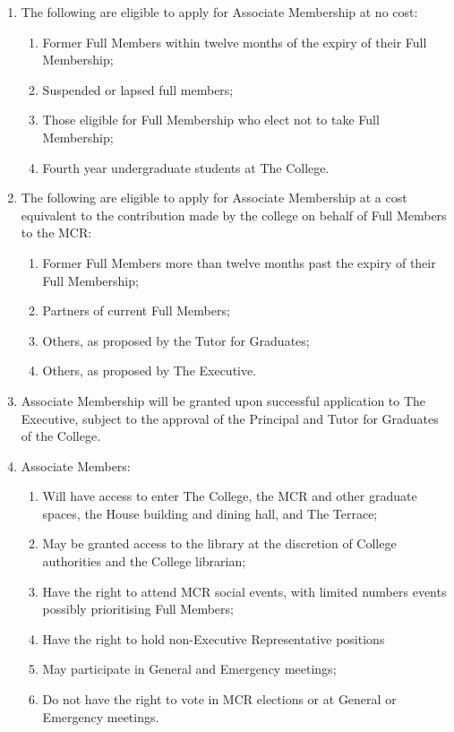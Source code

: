 \documentclass[11pt, a4paper]{article}
\begin{document}
\begin{enumerate}
    \item The following are eligible to apply for Associate Membership at no cost:
    \begin{enumerate}
        \item Former Full Members within twelve months of the expiry of their Full Membership;
        \item Suspended or lapsed full members;
        \item Those eligible for Full Membership who elect not to take Full Membership;
        \item Fourth year undergraduate students at The College.
    \end{enumerate}
    \item The following are eligible to apply for Associate Membership at a cost equivalent to the contribution made by the college on behalf of Full Members to the MCR:
    \begin{enumerate}
        \item Former Full Members more than twelve months past the expiry of their Full Membership;
        \item Partners of current Full Members;
        \item Others, as proposed by the Tutor for Graduates;
        \item Others, as proposed by The Executive.
    \end{enumerate}
    \item Associate Membership will be granted upon successful application to The Executive, subject to the approval of the Principal and Tutor for Graduates of the College.
    \item Associate Members:
    \begin{enumerate}
        \item Will have access to enter The College, the MCR and other graduate spaces, the House building and dining hall, and The Terrace;
        \item May be granted access to the library at the discretion of College authorities and the College librarian;
        \item Have the right to attend MCR social events, with limited numbers events possibly prioritising Full Members;
        \item Have the right to hold non-Executive Representative positions
        \item May participate in General and Emergency meetings;
        \item Do not have the right to vote in MCR elections or at General or Emergency meetings.

\end{enumerate}
\end{enumerate}
\end{document}
